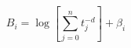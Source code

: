 \documentclass[11pt]{article}
\begin{document}


\[B_i = \log {\left[ \sum_{j = 0}^{n} t_{j}^{-d} \right]} + \beta_{i}\]


\end{document}
